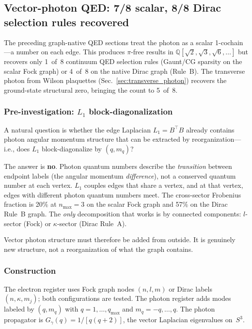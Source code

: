 \documentclass[11pt]{article}
\begin{document}
\subsection{Vector-photon QED: 7/8 scalar, 8/8 Dirac selection rules recovered}
\label{sec:vector_photon_qed}

The preceding graph-native QED sections treat the photon as a scalar
1-cochain---a number on each edge.  This produces $\pi$-free results
in $\mathbb{Q}[\sqrt{2}, \sqrt{3}, \sqrt{6}, \ldots]$ but recovers
only 1~of~8 continuum QED selection rules (Gaunt/CG sparsity on the
scalar Fock graph) or 4~of~8 on the native Dirac graph (Rule~B).  The
transverse photon from Wilson plaquettes
(Sec.~\ref{sec:transverse_photon}) recovers the ground-state structural
zero, bringing the count to 5~of~8.

\subsubsection{Pre-investigation: $L_1$ block-diagonalization}

A natural question is whether the edge Laplacian $L_1 = B^\top B$
already contains photon angular momentum structure that can be extracted
by reorganization---i.e., does $L_1$ block-diagonalize by
$(q, m_q)$?

The answer is \textbf{no}.  Photon quantum numbers describe the
\emph{transition} between endpoint labels (the angular momentum
\emph{difference}), not a conserved quantum number at each vertex.
$L_1$ couples edges that share a vertex, and at that vertex, edges
with different photon quantum numbers meet.  The cross-sector
Frobenius fraction is 20\% at $n_{\max} = 3$ on the scalar Fock graph
and 57\% on the Dirac Rule~B graph.  The \emph{only} decomposition
that works is by connected components: $l$-sector (Fock) or
$\kappa$-sector (Dirac Rule~A).

Vector photon structure must therefore be added from outside.  It is
genuinely new structure, not a reorganization of what the graph
contains.

\subsubsection{Construction}

The electron register uses Fock graph nodes $(n, l, m)$ or Dirac labels
$(n, \kappa, m_j)$; both configurations are tested.  The photon register
adds modes labeled by $(q, m_q)$ with $q = 1, \ldots, q_{\max}$ and
$m_q = -q, \ldots, q$.  The photon propagator is
$G_\gamma(q) = 1/[q(q+2)]$, the vector Laplacian eigenvalues on~$S^3$.
\end{document}
